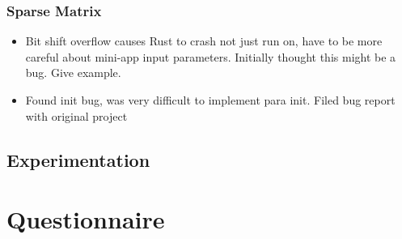 \subsubsection{Sparse Matrix}
\begin{itemize}
  \item Bit shift overflow causes Rust to crash not just run on, have to be more careful about mini-app input parameters. Initially thought this might be a bug. Give example.
  \item Found init bug, was very difficult to implement para init. Filed bug report with original project
\end{itemize}

\subsection{Experimentation}

\section{Questionnaire}
